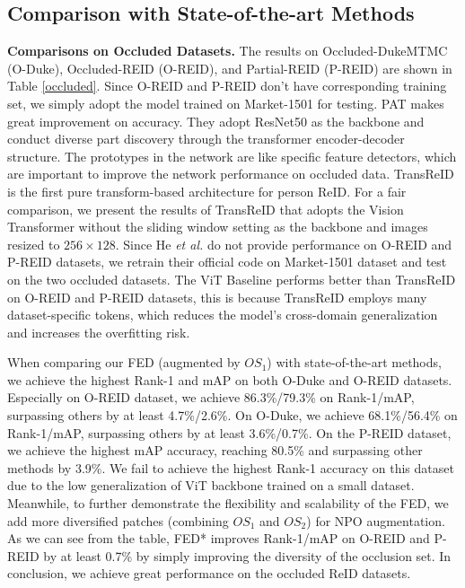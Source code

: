 \documentclass[10pt,twocolumn,letterpaper]{article}
\begin{document}
\subsection{Comparison with State-of-the-art Methods}
\textbf{Comparisons on Occluded Datasets.}
The results on Occluded-DukeMTMC (O-Duke), Occluded-REID (O-REID), and Partial-REID (P-REID) are shown in Table \ref{occluded}. Since O-REID and P-REID don't have  corresponding training set, we simply adopt the model trained on Market-1501 for testing.
PAT \cite{li2021diverse} makes great improvement on accuracy. They adopt ResNet50 \cite{he2016deep} as the backbone and conduct diverse part discovery through the transformer encoder-decoder structure. The prototypes in the network are like specific feature detectors, which are important to improve the network performance on occluded data. 
TransReID \cite{he2021transreid} is the first pure transform-based architecture for person ReID. For a fair comparison, we present the results of TransReID that adopts the Vision Transformer \cite{dosovitskiy2020image} without the sliding window setting as the backbone and images resized to $256 \times 128$. Since He \emph{et al.} \cite{he2021transreid} do not provide performance on O-REID and P-REID datasets, we retrain their official code on Market-1501 dataset and test on the two occluded datasets. The ViT Baseline performs better than TransReID on O-REID and P-REID datasets, this is because TransReID employs many dataset-specific tokens, which reduces the model's cross-domain generalization and increases the overfitting risk.


When comparing our FED (augmented by $OS_1$) with state-of-the-art methods, we achieve the highest Rank-1 and mAP on both O-Duke and O-REID datasets. Especially on O-REID dataset, we achieve 86.3\%/79.3\% on Rank-1/mAP, surpassing others by at least 4.7\%/2.6\%. On O-Duke, we achieve 68.1\%/56.4\% on Rank-1/mAP, surpassing others by at least 3.6\%/0.7\%. 
On the P-REID dataset, we achieve the highest mAP accuracy, reaching 80.5\% and surpassing other methods by 3.9\%. We fail to achieve the highest Rank-1 accuracy on this dataset due to the low generalization of ViT backbone trained on a small dataset. 
Meanwhile, to further demonstrate the flexibility and scalability of the FED, we add more diversified patches (combining $OS_1$ and $OS_2$) for NPO augmentation. As we can see from the table, FED* improves Rank-1/mAP on O-REID and P-REID by at least 0.7\% by simply improving the diversity of the occlusion set. In conclusion, we achieve great performance on the occluded ReID datasets. 
\end{document}
